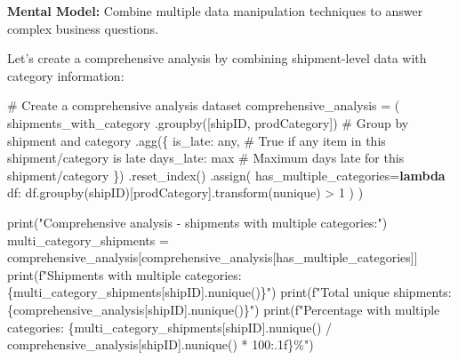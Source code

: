 \documentclass[
  letterpaper,
  DIV=11,
  numbers=noendperiod]{scrartcl}
\newenvironment{Shaded}{\begin{snugshade}}{\end{snugshade}}
\newcommand{\BuiltInTok}[1]{\textcolor[rgb]{0.00,0.23,0.31}{#1}}
\newcommand{\CommentTok}[1]{\textcolor[rgb]{0.37,0.37,0.37}{#1}}
\newcommand{\DecValTok}[1]{\textcolor[rgb]{0.68,0.00,0.00}{#1}}
\newcommand{\KeywordTok}[1]{\textcolor[rgb]{0.00,0.23,0.31}{\textbf{#1}}}
\newcommand{\NormalTok}[1]{\textcolor[rgb]{0.00,0.23,0.31}{#1}}
\newcommand{\OperatorTok}[1]{\textcolor[rgb]{0.37,0.37,0.37}{#1}}
\newcommand{\SpecialCharTok}[1]{\textcolor[rgb]{0.37,0.37,0.37}{#1}}
\newcommand{\SpecialStringTok}[1]{\textcolor[rgb]{0.13,0.47,0.30}{#1}}
\newcommand{\StringTok}[1]{\textcolor[rgb]{0.13,0.47,0.30}{#1}}
\begin{document}
\textbf{Mental Model:} Combine multiple data manipulation techniques to
answer complex business questions.

Let's create a comprehensive analysis by combining shipment-level data
with category information:

\label{mental-model-7-comprehensive}
\begin{Shaded}
\begin{Highlighting}[]
\CommentTok{\# Create a comprehensive analysis dataset}
\NormalTok{comprehensive\_analysis }\OperatorTok{=}\NormalTok{ (}
\NormalTok{    shipments\_with\_category}
\NormalTok{    .groupby([}\StringTok{\textquotesingle{}shipID\textquotesingle{}}\NormalTok{, }\StringTok{\textquotesingle{}prodCategory\textquotesingle{}}\NormalTok{])  }\CommentTok{\# Group by shipment and category}
\NormalTok{    .agg(\{}
        \StringTok{\textquotesingle{}is\_late\textquotesingle{}}\NormalTok{: }\StringTok{\textquotesingle{}any\textquotesingle{}}\NormalTok{,  }\CommentTok{\# True if any item in this shipment/category is late}
        \StringTok{\textquotesingle{}days\_late\textquotesingle{}}\NormalTok{: }\StringTok{\textquotesingle{}max\textquotesingle{}}  \CommentTok{\# Maximum days late for this shipment/category}
\NormalTok{    \})}
\NormalTok{    .reset\_index()}
\NormalTok{    .assign(}
\NormalTok{        has\_multiple\_categories}\OperatorTok{=}\KeywordTok{lambda}\NormalTok{ df: df.groupby(}\StringTok{\textquotesingle{}shipID\textquotesingle{}}\NormalTok{)[}\StringTok{\textquotesingle{}prodCategory\textquotesingle{}}\NormalTok{].transform(}\StringTok{\textquotesingle{}nunique\textquotesingle{}}\NormalTok{) }\OperatorTok{\textgreater{}} \DecValTok{1}
\NormalTok{    )}
\NormalTok{)}

\BuiltInTok{print}\NormalTok{(}\StringTok{"Comprehensive analysis {-} shipments with multiple categories:"}\NormalTok{)}
\NormalTok{multi\_category\_shipments }\OperatorTok{=}\NormalTok{ comprehensive\_analysis[comprehensive\_analysis[}\StringTok{\textquotesingle{}has\_multiple\_categories\textquotesingle{}}\NormalTok{]]}
\BuiltInTok{print}\NormalTok{(}\SpecialStringTok{f"Shipments with multiple categories: }\SpecialCharTok{\{}\NormalTok{multi\_category\_shipments[}\StringTok{\textquotesingle{}shipID\textquotesingle{}}\NormalTok{]}\SpecialCharTok{.}\NormalTok{nunique()}\SpecialCharTok{\}}\SpecialStringTok{"}\NormalTok{)}
\BuiltInTok{print}\NormalTok{(}\SpecialStringTok{f"Total unique shipments: }\SpecialCharTok{\{}\NormalTok{comprehensive\_analysis[}\StringTok{\textquotesingle{}shipID\textquotesingle{}}\NormalTok{]}\SpecialCharTok{.}\NormalTok{nunique()}\SpecialCharTok{\}}\SpecialStringTok{"}\NormalTok{)}
\BuiltInTok{print}\NormalTok{(}\SpecialStringTok{f"Percentage with multiple categories: }\SpecialCharTok{\{}\NormalTok{multi\_category\_shipments[}\StringTok{\textquotesingle{}shipID\textquotesingle{}}\NormalTok{]}\SpecialCharTok{.}\NormalTok{nunique() }\OperatorTok{/}\NormalTok{ comprehensive\_analysis[}\StringTok{\textquotesingle{}shipID\textquotesingle{}}\NormalTok{]}\SpecialCharTok{.}\NormalTok{nunique() }\OperatorTok{*} \DecValTok{100}\SpecialCharTok{:.1f\}}\SpecialStringTok{\%"}\NormalTok{)}
\end{Highlighting}
\end{Shaded}
\end{document}
